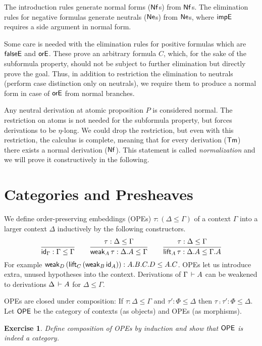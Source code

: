 \documentclass[a4paper]{article}
\newtheorem{exercise}[theorem]{Exercise}
\begin{document}
The introduction rules generate normal forms ($\tNf$s) from $\tNf$s.  The elimination
rules for negative formulas generate neutrals ($\tNe$s) from $\tNe$s, where
$\timpE$ requires a side argument in normal form.

Some care is needed with  the elimination rules for
positive formulas which are $\tfalseE$ and $\torE$.
These prove an arbitrary formula $C$, which, for the sake of the
subformula property, should not be subject to
further elimination but directly prove the goal.
Thus, in addition to restriction the elimination to neutrals
(perform case distinction only on neutrals),
we require them to produce a normal form
in case of $\torE$ from normal branches.

Any neutral derivation at atomic proposition $P$ is considered normal.
The restriction on atoms is not needed for the subformula property,
but forces derivations to be $\eta$-long.
We could drop the restriction, but even with this restriction, the
calculus is complete, meaning that for every derivation ($\tTm$) there
exists a normal derivation ($\tNf$).  This statement is called
\emph{normalization} and we will prove it constructively in the
following.


\section{Categories and Presheaves}

We define order-preserving embeddings (OPEs) $\tau : (\Delta \leq \Gamma)$ of a
context $\Gamma$ into a larger context $\Delta$ inductively by the
following constructors.
\begin{gather*}
  \ru{}{\id[\Gamma] : \Gamma \leq \Gamma}
\qquad
  \ru{\tau : \Delta \leq \Gamma
    }{\weak[A] \tau : \Delta.A \leq \Gamma}
\qquad
  \ru{\tau : \Delta \leq \Gamma
    }{\lift[A] \tau : \Delta.A \leq \Gamma.A}
\end{gather*}
For example $\weak [D] (\lift[C] (\weak[B] \id[A])) : A.B.C.D \leq
A.C$.  OPEs let us introduce extra, unused hypotheses into the
context.  Derivations of $\Gamma \der A$ can be weakened to
derivations $\Delta \der A$ for $\Delta \leq \Gamma$.

OPEs are closed under composition:  If $\tau : \Delta \leq \Gamma$ and
$\tau' : \Phi \leq \Delta$ then $\tau \comp \tau' : \Phi \leq \Delta$.
Let $\OPE$ be the category of contexts (as objects) and OPEs (as morphisms).
\begin{exercise}
  Define composition of OPEs by induction and show that $\OPE$ is
  indeed a category.
\end{exercise}
\end{document}
